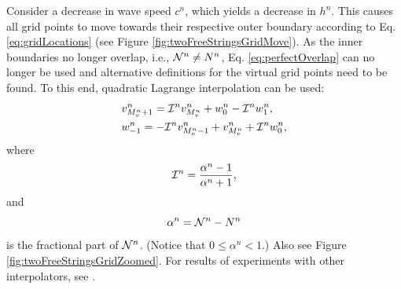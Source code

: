 \documentclass[fleqn]{jaes}
\def\SBcomment[#1]{\textcolor{red}{#1}}
\def\SWcomment[#1]{\textcolor{blue}{#1}}
\begin{document}
Consider a decrease in wave speed $c^n$, which yields a decrease in $h^n$. This causes all grid points to move towards their respective outer boundary according to Eq. \eqref{eq:gridLocations} (see Figure \ref{fig:twoFreeStringsGridMove}). As the inner boundaries no longer overlap, i.e., $\mathcal{N}^n \neq N^n$, Eq. \eqref{eq:perfectOverlap} can no longer be used and alternative definitions for the virtual grid points need to be found. To this end, quadratic %
Lagrange interpolation can be used:
\begin{subequations}\label{eq:connectionInterpol}
    \begin{align}
            &v_{\Mv+1}^n = \Aterm v_{\Mv}^n + w_0^n - \Aterm w_1^n,
        \label{eq:calcUMP1}\\
            &w_{-1}^n = -\Aterm v_{\Mv-1}^n + v_{\Mv}^n+\Aterm w_{0}^n,\label{eq:calcWM1}
    \end{align}
\end{subequations}
where
\begin{equation}\label{eq:aterm}
    \Aterm = \frac{\alpha^n-1}{\alpha^n+1},
\end{equation}
and 
\begin{equation}\label{eq:alphaDef}
    \alpha^n = \Nfrac^n - N^n
\end{equation}
is the fractional part of $\mathcal{N}^n$. (Notice that $0\leq \alpha^n < 1$.) Also see Figure \ref{fig:twoFreeStringsGridZoomed}. For results of experiments with other interpolators, see \cite[Sec. 12.3]{Willemsen2021Thesis}.
\end{document}
